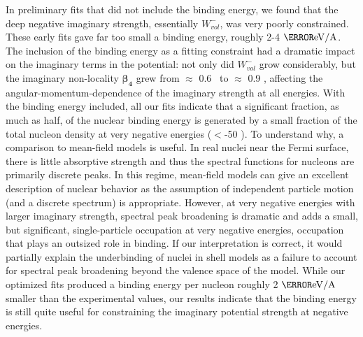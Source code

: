 In preliminary fits that did not include the binding energy,
we found that the deep negative imaginary strength, essentially $W_{vol}^{-}$,
was very poorly constrained. These early fits gave far too small a binding energy,
roughly 2-4 $\mega\electronvolt/\text{A}$.
The inclusion of the binding energy as a fitting constraint
had a dramatic impact on the imaginary terms in the potential: not only did
$W_{vol}^{-}$ grow considerably,
but the imaginary non-locality $\bm{\beta_{4}}$ grew from $\approx$
0.6 \femto\meter\ to $\approx$ 0.9 \femto\meter, affecting the
angular-momentum-dependence of the imaginary strength at all energies.
With the binding energy included, all our fits indicate that a significant
fraction, as much as half, of the nuclear binding energy is generated by a small
fraction of the total nucleon density at very negative energies ($<$-50 \mega\electronvolt).
To understand why, a comparison to mean-field models is useful.
In real nuclei near the Fermi surface, there is
little absorptive strength and thus the spectral functions for nucleons are
primarily discrete peaks. In this regime,
mean-field models can give an excellent description of nuclear behavior as the
assumption of independent particle motion (and a discrete spectrum) is appropriate.
However, at very negative energies with larger imaginary strength,
spectral peak broadening is dramatic and adds a small, but significant,
single-particle occupation at very negative energies, occupation
that plays an outsized role in binding. If our interpretation is
correct, it would partially explain the underbinding of
nuclei in shell models as a failure to account for spectral peak broadening
beyond the valence space of the model. While our optimized fits produced a
binding energy per nucleon roughly 2 $\mega\electronvolt/\text{A}$ smaller than the experimental
values, our results indicate that the binding energy is still quite useful for
constraining the imaginary potential strength at negative
energies.

